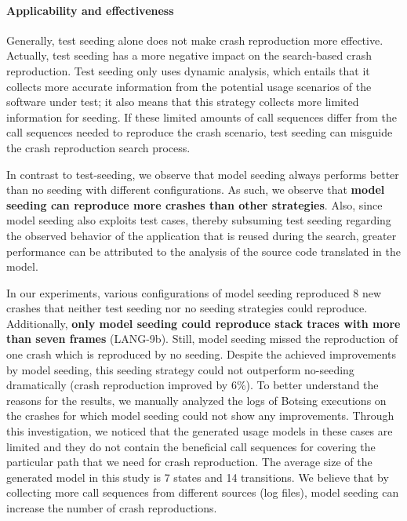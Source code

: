 

\paragraph{Applicability and effectiveness} Generally, test seeding alone does not make crash reproduction more effective. Actually, test seeding has a more negative impact on the search-based crash reproduction.
Test seeding only uses dynamic analysis, which entails that it collects more accurate information from the potential usage scenarios of the software under test; it also means that this strategy collects more limited information for seeding. If these limited amounts of call sequences differ from the call sequences needed to reproduce the crash scenario, test seeding can misguide the crash reproduction search process.

In contrast to test-seeding, we observe that model seeding always performs better than no seeding with different configurations. As such, we observe that \textbf{model seeding can reproduce more crashes than other strategies}. Also, since model seeding also exploits test cases, thereby subsuming test seeding regarding the observed behavior of the application that is reused during the search, greater performance can be attributed to the analysis of the source code translated in the model.

In our experiments, various configurations of model seeding reproduced 8 new crashes that neither test seeding nor no seeding strategies could reproduce. Additionally, \textbf{only model seeding could reproduce stack traces with more than seven frames} (\eg LANG-9b). Still, model seeding missed the reproduction of one crash which is reproduced by no seeding.
Despite the achieved improvements by model seeding, this seeding strategy could not outperform no-seeding dramatically (crash reproduction improved by 6\%). To better understand the reasons for the results, we manually analyzed the logs of Botsing executions on the crashes for which model seeding could not show any improvements. Through this investigation, we noticed that the generated usage models in these cases are limited and they do not contain the beneficial call sequences for covering the particular path that we need for crash reproduction. The average size of the generated model in this study is 7 states and 14 transitions.
We believe that by collecting more call sequences from different sources (\ie log files), model seeding can increase the number of crash reproductions.


